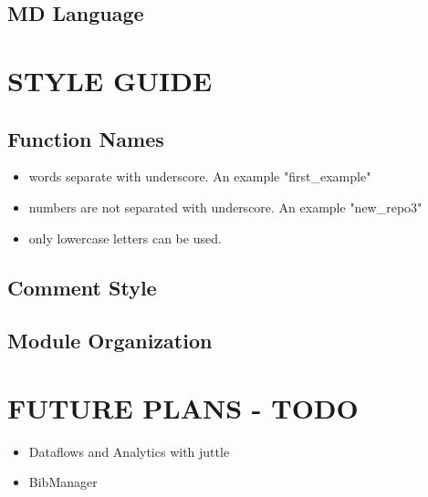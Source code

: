 \documentclass[12pt,twoside]{article}
\begin{document}
		
		\subsection*{MD Language}
	
	\section{STYLE GUIDE}
	
	\subsection*{Function Names}
	\begin{itemize}
		\item words separate with underscore. An example "first\_example"
		\item numbers are not separated with underscore. An example "new\_repo3"
		\item only lowercase letters can be used.
	\end{itemize}
	
	\subsection*{Comment Style}
	
	\subsection*{Module Organization}
	\section{FUTURE PLANS - TODO}
		\begin{itemize}
			\item Dataflows and Analytics with juttle
			\item BibManager
		\end{itemize}
	
	
\end{document}
